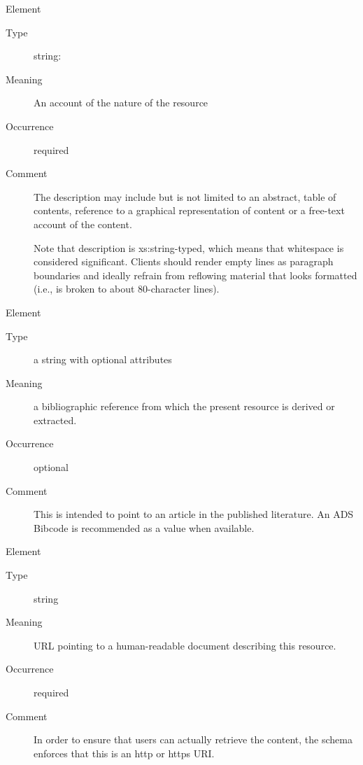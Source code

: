 \documentclass[11pt,a4paper]{ivoa}
\begin{document}
\begin{generated}
\begin{bigdescription}
\begin{description}
\end{description}
\item[Element \xmlel{description}]
\begin{description}
\item[Type] string: 
\item[Meaning]
               An account of the nature of the resource

\item[Occurrence] required
\item[Comment]
               The description may include but is not limited to an abstract,
               table of contents, reference to a graphical representation of
               content or a free-text account of the content.

               Note that description is xs:string-typed, which means that
               whitespace is considered significant.  Clients should
               render empty lines as paragraph boundaries and ideally
               refrain from reflowing material that looks formatted (i.e.,
               is broken to about 80-character lines).


\end{description}
\item[Element \xmlel{source}]
\begin{description}
\item[Type] a string with optional attributes
\item[Meaning]
                a bibliographic reference from which the present resource is
                derived or extracted.

\item[Occurrence] optional
\item[Comment]
                This is intended to point to an article in the published
                literature.  An ADS Bibcode is recommended as a value when
                available.


\end{description}
\item[Element \xmlel{referenceURL}]
\begin{description}
\item[Type] string
\item[Meaning]
                URL pointing to a human-readable document describing this
                resource.

\item[Occurrence] required

\item[Comment]
             	In order to ensure that users can actually retrieve the
             	content, the schema enforces that this is an http or https
             	URI.



\end{description}
\end{bigdescription}
\end{generated}
\end{document}
